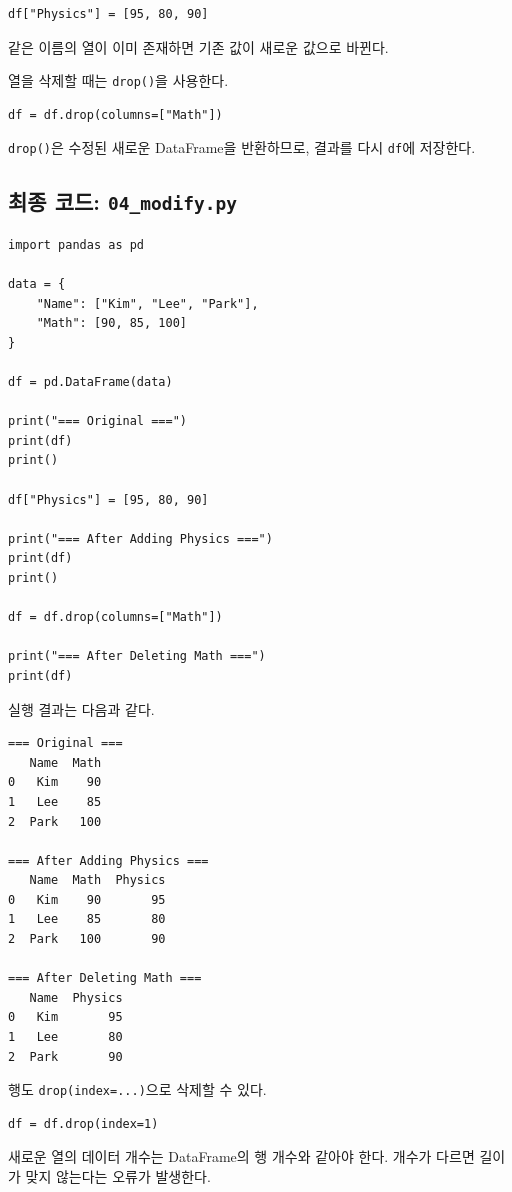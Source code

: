 \documentclass[11pt,a4paper]{article}
\begin{document}
\begin{lstlisting}
df["Physics"] = [95, 80, 90]
\end{lstlisting}

같은 이름의 열이 이미 존재하면 기존 값이 새로운 값으로 바뀐다.

열을 삭제할 때는 \texttt{drop()}을 사용한다.

\begin{lstlisting}
df = df.drop(columns=["Math"])
\end{lstlisting}

\texttt{drop()}은 수정된 새로운 DataFrame을 반환하므로, 결과를 다시 \texttt{df}에 저장한다.

\subsection{최종 코드: \texttt{04\_modify.py}}

\begin{lstlisting}
import pandas as pd

data = {
    "Name": ["Kim", "Lee", "Park"],
    "Math": [90, 85, 100]
}

df = pd.DataFrame(data)

print("=== Original ===")
print(df)
print()

df["Physics"] = [95, 80, 90]

print("=== After Adding Physics ===")
print(df)
print()

df = df.drop(columns=["Math"])

print("=== After Deleting Math ===")
print(df)
\end{lstlisting}

실행 결과는 다음과 같다.

\begin{verbatim}
=== Original ===
   Name  Math
0   Kim    90
1   Lee    85
2  Park   100

=== After Adding Physics ===
   Name  Math  Physics
0   Kim    90       95
1   Lee    85       80
2  Park   100       90

=== After Deleting Math ===
   Name  Physics
0   Kim       95
1   Lee       80
2  Park       90
\end{verbatim}

행도 \texttt{drop(index=...)}으로 삭제할 수 있다.

\begin{lstlisting}
df = df.drop(index=1)
\end{lstlisting}

\begin{importantbox}
새로운 열의 데이터 개수는 DataFrame의 행 개수와 같아야 한다. 개수가 다르면 길이가 맞지 않는다는 오류가 발생한다.
\end{importantbox}
\end{document}
